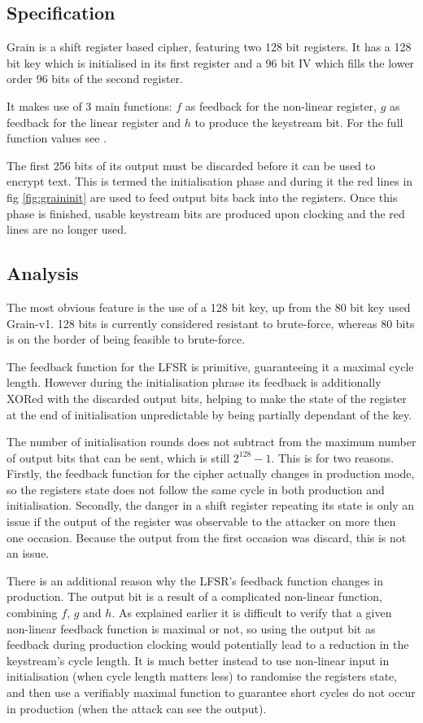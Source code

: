\documentclass{report}
\let\Oldsubsection\subsection
\renewcommand{\subsection}{\FloatBarrier\Oldsubsection}
\begin{document}
\subsection{Specification}
Grain is a shift register based cipher, featuring two 128 bit registers. It has a 128 bit key which is initialised in its first register and a 96 bit IV which fills the lower order 96 bits of the second register.

It makes use of 3 main functions: $f$ as feedback for the non-linear register, $g$ as feedback for the linear register and $h$ to produce the keystream bit. For the full function values see \cite{Grain128aSpec}.

The first 256 bits of its output must be discarded before it can be used to encrypt text. This is termed the initialisation phase and during it the red lines in fig \ref{fig:graininit} are used to feed output bits back into the registers. Once this phase is finished, usable keystream bits are produced upon clocking and the red lines are no longer used.
\subsection{Analysis}
The most obvious feature is the use of a 128 bit key, up from the 80 bit key used Grain-v1. 128 bits is currently considered resistant to brute-force, whereas 80 bits is on the border of being feasible to brute-force\cite{80keysize}.

The feedback function for the LFSR is primitive, guaranteeing it a maximal cycle length\cite{linearMaximal}. However during the initialisation phrase its feedback is additionally XORed with the discarded output bits, helping to make the state of the register at the end of initialisation unpredictable by being partially dependant of the key.

The number of initialisation rounds does not subtract from the maximum number of output bits that can be sent, which is still $2^{128}-1$. This is for two reasons. Firstly, the feedback function for the cipher actually changes in production mode, so the registers state does not follow the same cycle in both production and initialisation. Secondly, the danger in a shift register repeating its state is only an issue if the output of the register was observable to the attacker on more then one occasion. Because the output from the first occasion was discard, this is not an issue.

There is an additional reason why the LFSR's feedback function changes in production. The output bit is a result of a complicated non-linear function, combining $f$, $g$ and $h$. As explained earlier it is difficult to verify that a given non-linear feedback function is maximal or not, so using the output bit as feedback during production clocking would potentially lead to a reduction in the keystream's cycle length. It is much better instead to use non-linear input in initialisation (when cycle length matters less) to randomise the registers state, and then use a verifiably maximal function to guarantee short cycles do not occur in production (when the attack can see the output).
\end{document}
